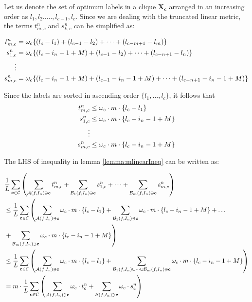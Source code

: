 \documentclass[10pt,letterpaper]{article}
\begin{document}
Let us denote the set of optimum labels in a clique $\mathbf{X_{c}}$ arranged in an increasing order as ${l_1, l_2....., l_{c-1}, l_c}$. Since we are dealing with the truncated linear metric, the terms $t_{m, c}^n$ and $s_{k, c}^n$ can be simplified as:

\begin{align*}
t_{m, c}^n & = {\bf \omega}_{c}\{(l_c - l_1) + (l_{c - 1} - l_2) + \dots + (l_{c - m + 1} - l_m)\} \\
s_{1, c}^n & = {\bf \omega}_{c}\{(l_c - i_n - 1 + M) + (l_{c - 1} - l_2) + \dots + (l_{c - n + 1}- l_n)\}\\
\vdots \\
s_{m, c}^n & = {\bf \omega}_{c}\{(l_c - i_n - 1 + M) + (l_{c - 1} - i_n - 1 + M) + \dots + (l_{c - n + 1}- i_n - 1 + M)\}\\
\end{align*}

Since the labels are sorted in ascending order $\{l_1, \dots , l_c \}$, it follows that
\begin{align*}
t_{m, c}^n & \leq {\bf \omega}_{c} \cdot m \cdot \{l_c - l_1 \} \\
s_{1, c}^n & \leq {\bf \omega}_{c} \cdot m \cdot \{l_c - i_n - 1 + M\} \\ 
\vdots \\
s_{m, c}^n & \leq {\bf \omega}_{c} \cdot m \cdot \{l_c - i_n - 1 + M\} \\ 
\end{align*}

The LHS of inequality in lemma \ref{lemma:mlinearIneq} can be written as:

\begin{equation}
\begin{split}
& \frac{1}{L}\sum_{{\bf c} \in \mathcal{C}}\left(\sum_{\mathcal{A}\mathit(f, I_n) \ni {\bf c}} t_{m, c}^n + \sum_{\mathcal{B}_1 \mathit(f, I_n) \ni {\bf c}} s_{1, c}^n + \dots + \sum_{\mathcal{B}_m \mathit(f, I_n) \ni {\bf c}} s_{m, c}^n \right) \\
& \leq \frac{1}{L}\sum_{{\bf c} \in \mathcal{C}}\left(\sum_{\mathcal{A}\mathit(f, I_n) \ni {\bf c}} {\bf \omega}_{c} \cdot m \cdot \{l_c - l_1 \} + \sum_{\mathcal{B}_1 \mathit(f, I_n) \ni {\bf c}} {\bf \omega}_{c} \cdot m \cdot \{l_c - i_n - 1 + M\} + \dots \right. \\
&\left. + \sum_{\mathcal{B}_m \mathit(f, I_n) \ni {\bf c}} {\bf \omega}_{c} \cdot m \cdot \{l_c - i_n - 1 + M\}\right) \\
& \leq \frac{1}{L}\sum_{{\bf c} \in \mathcal{C}}\left(\sum_{\mathcal{A}\mathit(f, I_n) \ni {\bf c}} {\bf \omega}_{c} \cdot m \cdot \{l_c - l_1 \} + \sum_{\mathcal{B}_1 \mathit(f, I_n) \cup \dots \cup \mathcal{B}_m \mathit(f, I_n) \ni {\bf c}} {\bf \omega}_{c} \cdot m \cdot \{l_c - i_n - 1 + M\} \right) \\
& = m \cdot \frac{1}{L}\sum_{{\bf c} \in \mathcal{C}}\left(\sum_{\mathcal{A}\mathit(f, I_n) \ni {\bf c}} {\bf \omega}_{c} \cdot t_c^n + \sum_{\mathcal{B} \mathit(f, I_n) \ni {\bf c}} {\bf \omega}_{c} \cdot s_c^n \right) \\
\label{eq:mrewriteIneq}
\end{split}
\end{equation}
\end{document}
